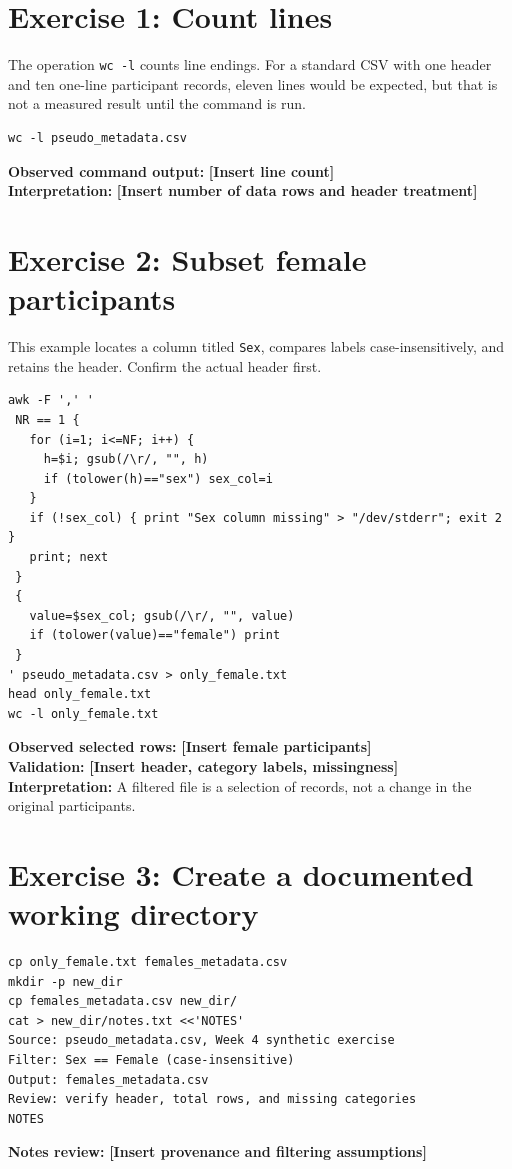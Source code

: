 \documentclass[11pt,letterpaper]{article}
\newcommand{\fillin}[1]{\textbf{[Insert #1]}}
\begin{document}
\section{Exercise 1: Count lines}
The operation \texttt{wc -l} counts line endings. For a standard CSV with one
header and ten one-line participant records, eleven lines would be expected,
but that is not a measured result until the command is run.
\begin{lstlisting}
wc -l pseudo_metadata.csv
\end{lstlisting}
\noindent\textbf{Observed command output:} \fillin{line count}\\
\textbf{Interpretation:} \fillin{number of data rows and header treatment}

\section{Exercise 2: Subset female participants}
This example locates a column titled \texttt{Sex}, compares labels
case-insensitively, and retains the header. Confirm the actual header first.
\begin{lstlisting}
awk -F ',' '
 NR == 1 {
   for (i=1; i<=NF; i++) {
     h=$i; gsub(/\r/, "", h)
     if (tolower(h)=="sex") sex_col=i
   }
   if (!sex_col) { print "Sex column missing" > "/dev/stderr"; exit 2 }
   print; next
 }
 {
   value=$sex_col; gsub(/\r/, "", value)
   if (tolower(value)=="female") print
 }
' pseudo_metadata.csv > only_female.txt
head only_female.txt
wc -l only_female.txt
\end{lstlisting}
\noindent\textbf{Observed selected rows:} \fillin{female participants}\\
\textbf{Validation:} \fillin{header, category labels, missingness}\\
\textbf{Interpretation:} A filtered file is a selection of records, not a
change in the original participants.

\section{Exercise 3: Create a documented working directory}
\begin{lstlisting}
cp only_female.txt females_metadata.csv
mkdir -p new_dir
cp females_metadata.csv new_dir/
cat > new_dir/notes.txt <<'NOTES'
Source: pseudo_metadata.csv, Week 4 synthetic exercise
Filter: Sex == Female (case-insensitive)
Output: females_metadata.csv
Review: verify header, total rows, and missing categories
NOTES
\end{lstlisting}
\noindent\textbf{Notes review:} \fillin{provenance and filtering assumptions}
\end{document}
